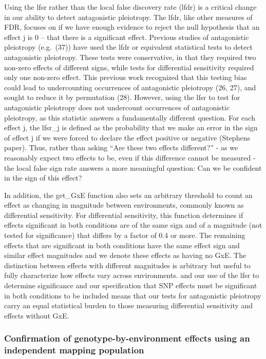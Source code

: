 \documentclass[
  9pt,
  twocolumn,
  twoside]{pnas-new}
\begin{document}
Using the lfsr rather than the local false discovery rate (lfdr) is a
critical change in our ability to detect antagonistic pleiotropy. The
lfdr, like other measures of FDR, focuses on if we have enough evidence
to reject the null hypothesis that an effect j is 0 -- that there is a
significant effect. Previous studies of antagonistic pleiotropy
(e.g.~(37)) have used the lfdr or equivalent statistical tests to detect
antagonistic pleiotropy. These tests were conservative, in that they
required two non-zero effects of different signs, while tests for
differential sensitivity required only one non-zero effect. This
previous work recognized that this testing bias could lead to
undercounting occurrences of antagonistic pleiotropy (26, 27), and
sought to reduce it by permutation (28). However, using the lfsr to test
for antagonistic pleiotropy does not undercount occurrences of
antagonistic pleiotropy, as this statistic answers a fundamentally
different question. For each effect j, the lfsr\_j is defined as the
probability that we make an error in the sign of effect j if we were
forced to declare the effect positive or negative (Stephens paper).
Thus, rather than asking ``Are these two effects different?'' - as we
reasonably expect two effects to be, even if this difference cannot be
measured - the local false sign rate answers a more meaningful question:
Can we be confident in the sign of this effect?

In addition, the get\_GxE function also sets an arbitrary threshold to
count an effect as changing in magnitude between environments, commonly
known as differential sensitivity. For differential sensitivity, this
function determines if effects significant in both conditions are of the
same sign and of a magnitude (not tested for significance) that differs
by a factor of 0.4 or more. The remaining effects that are significant
in both conditions have the same effect sign and similar effect
magnitudes and we denote these effects as having no GxE. The distinction
between effects with different magnitudes is arbitrary but useful to
fully characterize how effects vary across environments. and our use of
the lfsr to determine significance and our specification that SNP
effects must be significant in both conditions to be included means that
our tests for antagonistic pleiotropy carry an equal statistical burden
to those measuring differential sensitivity and effects without GxE.

\subsubsection{Confirmation of genotype-by-environment effects using an
independent mapping
population}\label{confirmation-of-genotype-by-environment-effects-using-an-independent-mapping-population-1}
\end{document}
